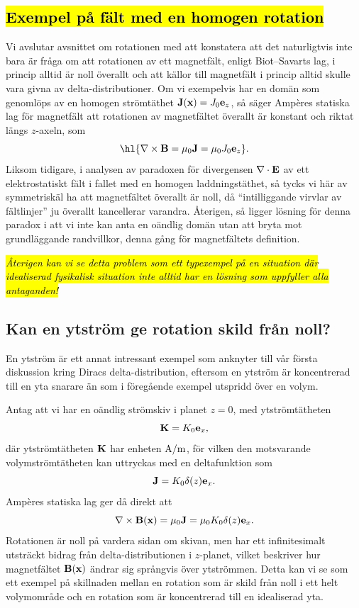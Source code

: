 \subsection{{\hl{Exempel p{\aa} f{\"a}lt med en homogen rotation}}}
Vi avslutar avsnittet om rotationen med att konstatera att det naturligtvis
inte bara {\"a}r fr{\aa}ga om att rotationen av ett magnetf{\"a}lt, enligt
Biot--Savarts lag, i princip alltid {\"a}r noll {\"o}verallt och att k{\"a}llor
till magnetf{\"a}lt i princip alltid skulle vara givna av delta-distributioner.
\noindent
Om vi exempelvis har en dom{\"a}n som genoml{\"o}ps av en homogen
str{\"o}mt{\"a}thet ${\bf J}({\bf x})=J_0{\bf e}_z$, s{\aa} s{\"a}ger
Amp{\`e}res statiska lag f{\"o}r magnetf{\"a}lt att rotationen av
magnetf{\"a}ltet {\"o}verallt {\"a}r konstant och riktat l{\"a}ngs
$z$-axeln, som
$$
  \hl{\nabla\times{\bf B}=\mu_0{\bf J}=\mu_0J_0{\bf e}_z}.
$$
Liksom tidigare, i analysen av paradoxen f{\"o}r divergensen
$\nabla\cdot{\bf E}$ av ett elektrostatiskt f{\"a}lt i fallet med en homogen
laddningst{\"a}thet, s{\aa} tycks vi h{\"a}r av symmetrisk{\"a}l ha att
magnetf{\"a}ltet {\"o}verallt {\"a}r noll, d{\aa} ``intilliggande virvlar
av f{\"a}ltlinjer'' ju {\"o}verallt kancellerar varandra.
{\AA}terigen, s{\aa} ligger l{\"o}sning f{\"o}r denna paradox i att vi inte kan
anta en o{\"a}ndlig dom{\"a}n utan att bryta mot grundl{\"a}ggande randvillkor,
denna g{\aa}ng f{\"o}r magnetf{\"a}ltets definition.

{\hl{\it {\AA}terigen kan vi se detta problem som ett typexempel p{\aa} en
situation d{\"a}r idealiserad fysikalisk situation inte alltid har en
l{\"o}sning som uppfyller alla antaganden!}}

\subsection{Kan en ytstr{\"o}m ge rotation skild fr{\aa}n noll?}
En ytstr{\"o}m {\"a}r ett annat intressant exempel som anknyter till v{\aa}r
f{\"o}rsta diskussion kring Diracs delta-distribution, eftersom en ytstr{\"o}m
{\"a}r koncentrerad till en yta snarare {\"a}n som i f{\"o}reg{\aa}ende exempel
utspridd {\"o}ver en volym.

Antag att vi har en o{\"a}ndlig str{\"o}mskiv i planet $z=0$, med
ytstr{\"o}mt{\"a}theten
$$
  {\bf K}=K_0{\bf e}_x,
$$
d{\"a}r ytstr{\"o}mt{\"a}theten ${\bf K}$ har enheten ${\rm A}/{\rm m}$,
f{\"o}r vilken den motsvarande volymstr{\"o}mt{\"a}theten kan uttryckas med
en deltafunktion som
$$
  {\bf J}=K_0\delta(z){\bf e}_x.
$$
Amp{\`e}res statiska lag ger d{\aa} direkt att
$$
  \nabla\times{\bf B}({\bf x})=\mu_0{\bf J}=\mu_0K_0\delta(z){\bf e}_x.
$$
Rotationen {\"a}r noll p{\aa} vardera sidan om skivan, men har ett
infinitesimalt utstr{\"a}ckt bidrag fr{\aa}n delta-distributionen i $z$-planet,
vilket beskriver hur magnetf{\"a}ltet ${\bf B}({\bf x})$ {\"a}ndrar sig
spr{\aa}ngvis {\"o}ver ytstr{\"o}mmen. Detta kan vi se som ett exempel p{\aa}
skillnaden mellan en rotation som {\"a}r skild fr{\aa}n noll i ett helt
volymomr{\aa}de och en rotation som {\"a}r koncentrerad till en idealiserad
yta.
\vfill\eject

